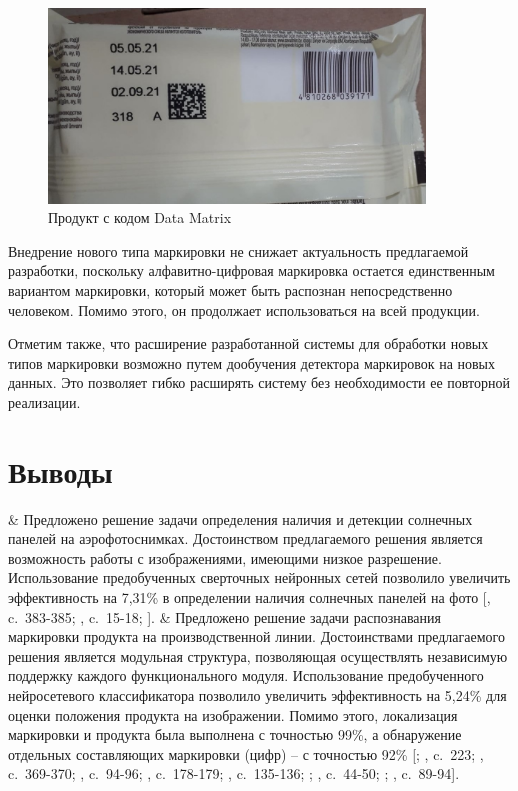 \begin{figure}[!ht]
	\centering
	\includegraphics[width=10cm]{man-source/images/ch4/pic4-2.jpg}
	\caption{Продукт с кодом Data Matrix}
	\label{fig:data_matrix}
\end{figure}

Внедрение нового типа маркировки не снижает актуальность предлагаемой разработки, поскольку алфавитно-цифровая маркировка остается единственным вариантом маркировки, который может быть распознан непосредственно человеком. Помимо этого, он продолжает использоваться на всей продукции.

Отметим также, что расширение разработанной системы для обработки новых типов маркировки возможно путем дообучения детектора маркировок на новых данных. Это позволяет гибко расширять систему без необходимости ее повторной реализации.

\section{Выводы}

\begin{easylistNum}
    & Предложено решение задачи определения наличия и детекции солнечных панелей на аэрофотоснимках. Достоинством предлагаемого решения является возможность работы с изображениями, имеющими низкое разрешение. Использование предобученных сверточных нейронных сетей позволило увеличить эффективность на 7,31\% в определении наличия солнечных панелей на фото [, c.~383-385; , c.~15-18; ].
	& Предложено решение задачи распознавания маркировки продукта на производственной линии. Достоинствами предлагаемого решения является модульная структура, позволяющая осуществлять независимую поддержку каждого функционального модуля. Использование предобученного нейросетевого классификатора позволило увеличить эффективность на 5,24\% для оценки положения продукта на изображении. Помимо этого, локализация маркировки и продукта была выполнена с точностью 99\%, а обнаружение отдельных составляющих маркировки (цифр) -- с точностью 92\% [; , c.~223; , c.~369-370; , c.~94-96; , c.~178-179; , c.~135-136; ; , c.~44-50; ; , c.~89-94].
\end{easylistNum}
